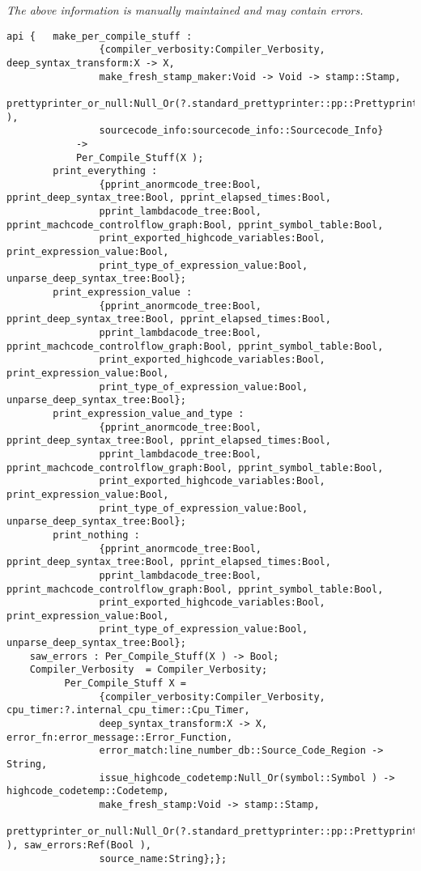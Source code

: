 \label{pkg:per\_compile\_stuff}

{\tiny \it The above information is manually maintained and may contain errors.}
\begin{verbatim}
api {   make_per_compile_stuff :
                {compiler_verbosity:Compiler_Verbosity, deep_syntax_transform:X -> X,
                make_fresh_stamp_maker:Void -> Void -> stamp::Stamp,
                prettyprinter_or_null:Null_Or(?.standard_prettyprinter::pp::Prettyprinter ),
                sourcecode_info:sourcecode_info::Sourcecode_Info}
            ->
            Per_Compile_Stuff(X );
        print_everything :
                {pprint_anormcode_tree:Bool, pprint_deep_syntax_tree:Bool, pprint_elapsed_times:Bool,
                pprint_lambdacode_tree:Bool, pprint_machcode_controlflow_graph:Bool, pprint_symbol_table:Bool,
                print_exported_highcode_variables:Bool, print_expression_value:Bool,
                print_type_of_expression_value:Bool, unparse_deep_syntax_tree:Bool};
        print_expression_value :
                {pprint_anormcode_tree:Bool, pprint_deep_syntax_tree:Bool, pprint_elapsed_times:Bool,
                pprint_lambdacode_tree:Bool, pprint_machcode_controlflow_graph:Bool, pprint_symbol_table:Bool,
                print_exported_highcode_variables:Bool, print_expression_value:Bool,
                print_type_of_expression_value:Bool, unparse_deep_syntax_tree:Bool};
        print_expression_value_and_type :
                {pprint_anormcode_tree:Bool, pprint_deep_syntax_tree:Bool, pprint_elapsed_times:Bool,
                pprint_lambdacode_tree:Bool, pprint_machcode_controlflow_graph:Bool, pprint_symbol_table:Bool,
                print_exported_highcode_variables:Bool, print_expression_value:Bool,
                print_type_of_expression_value:Bool, unparse_deep_syntax_tree:Bool};
        print_nothing :
                {pprint_anormcode_tree:Bool, pprint_deep_syntax_tree:Bool, pprint_elapsed_times:Bool,
                pprint_lambdacode_tree:Bool, pprint_machcode_controlflow_graph:Bool, pprint_symbol_table:Bool,
                print_exported_highcode_variables:Bool, print_expression_value:Bool,
                print_type_of_expression_value:Bool, unparse_deep_syntax_tree:Bool};
    saw_errors : Per_Compile_Stuff(X ) -> Bool;
    Compiler_Verbosity  = Compiler_Verbosity;
          Per_Compile_Stuff X =
                {compiler_verbosity:Compiler_Verbosity, cpu_timer:?.internal_cpu_timer::Cpu_Timer,
                deep_syntax_transform:X -> X, error_fn:error_message::Error_Function,
                error_match:line_number_db::Source_Code_Region -> String,
                issue_highcode_codetemp:Null_Or(symbol::Symbol ) -> highcode_codetemp::Codetemp,
                make_fresh_stamp:Void -> stamp::Stamp,
                prettyprinter_or_null:Null_Or(?.standard_prettyprinter::pp::Prettyprinter ), saw_errors:Ref(Bool ),
                source_name:String};};
\end{verbatim}
